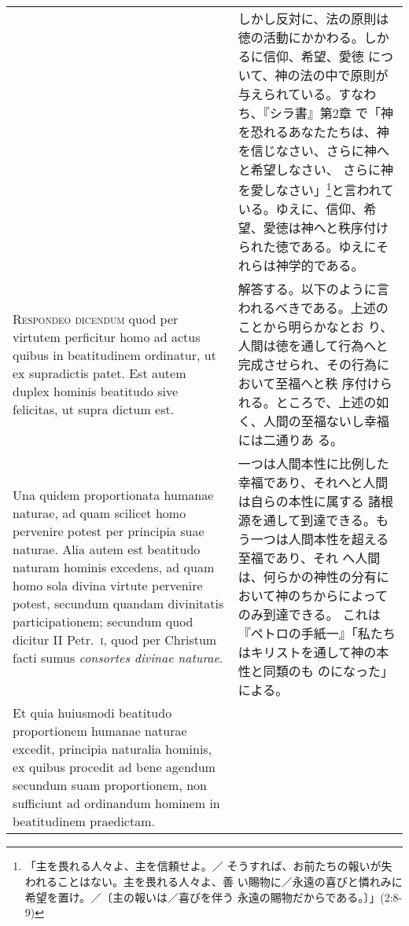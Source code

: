 \documentclass[10pt]{jsarticle}
\begin{document}
\begin{longtable}{p{21em}p{21em}}
 &

 しかし反対に、法の原則は徳の活動にかかわる。しかるに信仰、希望、愛徳
 について、神の法の中で原則が与えられている。すなわち、『シラ書』第2章
 で「神を恐れるあなたたちは、神を信じなさい、さらに神へと希望しなさい、
 さらに神を愛しなさい」\footnote{「主を畏れる人々よ、主を信頼せよ。／
 そうすれば、お前たちの報いが失われることはない。主を畏れる人々よ、善
 い賜物に／永遠の喜びと憐れみに希望を置け。／〔主の報いは／喜びを伴う
 永遠の賜物だからである。〕」(2:8-9) }と言われている。ゆえに、信仰、希
 望、愛徳は神へと秩序付けられた徳である。ゆえにそれらは神学的である。

\\



{\scshape Respondeo dicendum} quod per virtutem perficitur homo ad
actus quibus in beatitudinem ordinatur, ut ex supradictis patet. Est
autem duplex hominis beatitudo sive felicitas, ut supra dictum
 est.


&

 解答する。以下のように言われるべきである。上述のことから明らかなとお
 り、人間は徳を通して行為へと完成させられ、その行為において至福へと秩
 序付けられる。ところで、上述の如く、人間の至福ないし幸福には二通りあ
 る。
 
\\


 Una quidem proportionata humanae naturae, ad quam scilicet homo
pervenire potest per principia suae naturae. Alia autem est beatitudo
naturam hominis excedens, ad quam homo sola divina virtute pervenire
potest, secundum quandam divinitatis participationem; secundum quod
dicitur II Petr.~{\scshape i}, quod  per Christum facti sumus
{\itshape consortes divinae naturae}.

&

 一つは人間本性に比例した幸福であり、それへと人間は自らの本性に属する
 諸根源を通して到達できる。もう一つは人間本性を超える至福であり、それ
 へ人間は、何らかの神性の分有において神のちからによってのみ到達できる。
 これは『ペトロの手紙一』「私たちはキリストを通して神の本性と同類のも
 のになった」による。

 
\\

 Et quia huiusmodi beatitudo proportionem humanae naturae excedit,
principia naturalia hominis, ex quibus procedit ad bene agendum
secundum suam proportionem, non sufficiunt ad ordinandum hominem in
beatitudinem praedictam.


&


\end{longtable}
\end{document}
